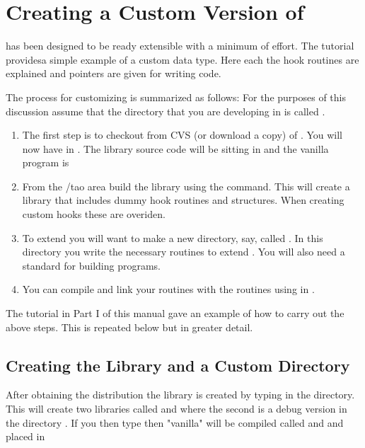 
\chapter{Creating a Custom Version of \tao}
\label{c:prog_intro} 

\tao has been designed to be ready extensible with a minimum of
effort. The tutorial providesa simple example of a custom data type. Here each
the hook routines are explained and pointers are given for writing code. 

The process for customizing is summarized as follows: For the purposes of this
discussion assume that the directory that you are developing \tao in
is called . 
\begin{enumerate}
\item 
The first step is to checkout from CVS (or download a
copy) of \tao. You will now have \tao in
. The library source code will be sitting in 
and the vanilla \tao program is 
\item 
From the /tao area build the \tao library using the
 command. This will create a \tao library that includes dummy hook
routines and structures. When creating custom hooks these are overiden.
\item
To extend \tao you will want to make a new
directory, say, called . In this directory you write
the necessary routines to extend \tao. You will also need a standard 
 for building programs.
\item
You can compile and link your routines with the \tao routines using
 in .
\end{enumerate}

The tutorial in Part I of this manual gave an example of how to carry out the
above steps. This is repeated below but in greater detail.

\section{Creating the \tao Library and a Custom \tao Directory}

After obtaining the \tao distribution the \tao library is created by typing 
 in the  directory. This will create two libraries
called  and  where the second is a debug version
in the directory . If you then type  then
"vanilla" \tao will be compiled called  and  and placed in


